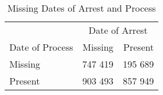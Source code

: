 \begin{table}[t]

\caption{\label{tab:missing_date_of_arrest_process}Missing Dates of Arrest and Process}
\centering
\begin{tabular}{lrr}
\toprule
\multicolumn{1}{c}{ } & \multicolumn{2}{c}{Date of Arrest} \\
\cmidrule(l{2pt}r{2pt}){2-3}
Date of Process & Missing & Present\\
\midrule
Missing & 747 419 & 195 689\\
Present & 903 493 & 857 949\\
\bottomrule
\end{tabular}
\end{table}